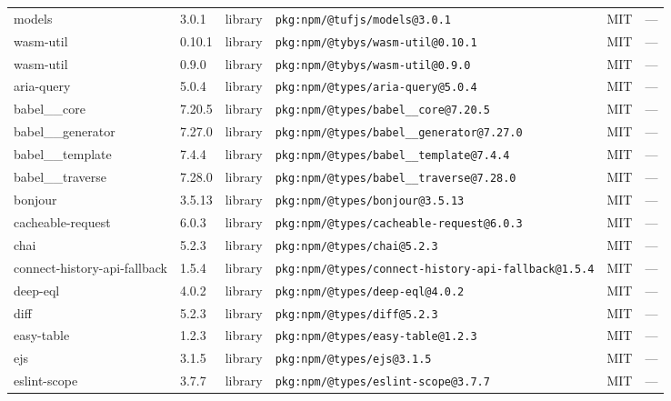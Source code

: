 \documentclass[11pt,a4paper]{article}
\begin{document}
\begin{longtable}{|p{4cm}|p{2cm}|p{1.6cm}|p{5cm}|p{1.5cm}|p{3.5cm}|}
\raggedright models & 3.0.1 & library & \small\texttt{pkg:npm/@tufjs/models@3.0.1} & MIT & \small — \\
\raggedright wasm-util & 0.10.1 & library & \small\texttt{pkg:npm/@tybys/wasm-util@0.10.1} & MIT & \small — \\
\raggedright wasm-util & 0.9.0 & library & \small\texttt{pkg:npm/@tybys/wasm-util@0.9.0} & MIT & \small — \\
\raggedright aria-query & 5.0.4 & library & \small\texttt{pkg:npm/@types/aria-query@5.0.4} & MIT & \small — \\
\raggedright babel\_\_core & 7.20.5 & library & \small\texttt{pkg:npm/@types/babel\_\_core@7.20.5} & MIT & \small — \\
\raggedright babel\_\_generator & 7.27.0 & library & \small\texttt{pkg:npm/@types/babel\_\_generator@7.27.0} & MIT & \small — \\
\raggedright babel\_\_template & 7.4.4 & library & \small\texttt{pkg:npm/@types/babel\_\_template@7.4.4} & MIT & \small — \\
\raggedright babel\_\_traverse & 7.28.0 & library & \small\texttt{pkg:npm/@types/babel\_\_traverse@7.28.0} & MIT & \small — \\
\raggedright bonjour & 3.5.13 & library & \small\texttt{pkg:npm/@types/bonjour@3.5.13} & MIT & \small — \\
\raggedright cacheable-request & 6.0.3 & library & \small\texttt{pkg:npm/@types/cacheable-request@6.0.3} & MIT & \small — \\
\raggedright chai & 5.2.3 & library & \small\texttt{pkg:npm/@types/chai@5.2.3} & MIT & \small — \\
\raggedright connect-history-api-fallback & 1.5.4 & library & \small\texttt{pkg:npm/@types/connect-history-api-fallback@1.5.4} & MIT & \small — \\
\raggedright deep-eql & 4.0.2 & library & \small\texttt{pkg:npm/@types/deep-eql@4.0.2} & MIT & \small — \\
\raggedright diff & 5.2.3 & library & \small\texttt{pkg:npm/@types/diff@5.2.3} & MIT & \small — \\
\raggedright easy-table & 1.2.3 & library & \small\texttt{pkg:npm/@types/easy-table@1.2.3} & MIT & \small — \\
\raggedright ejs & 3.1.5 & library & \small\texttt{pkg:npm/@types/ejs@3.1.5} & MIT & \small — \\
\raggedright eslint-scope & 3.7.7 & library & \small\texttt{pkg:npm/@types/eslint-scope@3.7.7} & MIT & \small — \\

\end{longtable}
\end{document}
